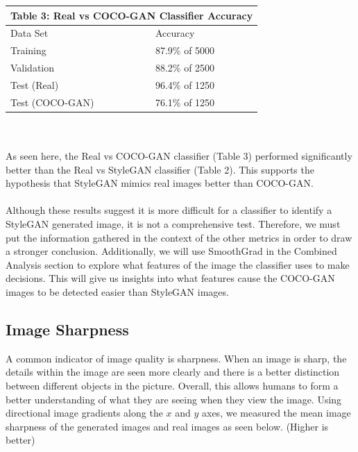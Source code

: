 \documentclass[10pt]{article}
\begin{document}
\begin{multicols*}{2}
        \begin{tabular}{ |p{4cm}|p{3cm}|  }
             \hline
             \multicolumn{2}{|c|}{Table 3: \textbf{Real vs COCO-GAN Classifier Accuracy}} \\
             \hline
            Data Set     & Accuracy\\
             \hline
            Training        & 87.9\% of 5000 \\
             \hline
            Validation      & 88.2\% of 2500 \\
             \hline
            Test (Real)     & 96.4\% of 1250 \\
             \hline
            Test (COCO-GAN) & 76.1\% of 1250 \\
             \hline
        \end{tabular}
        \\\\
        As seen here, the Real vs COCO-GAN classifier (Table 3) performed significantly better than the Real vs StyleGAN classifier (Table 2).
        This supports the hypothesis that StyleGAN mimics real images better than COCO-GAN.
        \\\\
        Although these results suggest it is more difficult for a classifier to identify a StyleGAN generated image, it is not a comprehensive test.
        Therefore, we must put the information gathered in the context of the other metrics in order to draw a stronger conclusion.
        Additionally, we will use SmoothGrad\cite{smoothgrad} in the Combined Analysis section to explore what features of the image the classifier uses to make decisions.
        This will give us insights into what features cause the COCO-GAN images to be detected easier than StyleGAN images.

        \subsection{Image Sharpness}
        \label{subsec:imageSharpness}
        A common indicator of image quality is sharpness.
        When an image is sharp, the details within the image are seen more clearly and there is a better distinction between different objects in the picture.
        Overall, this allows humans to form a better understanding of what they are seeing when they view the image.
        Using directional image gradients along the $x$ and $y$ axes, we measured the mean image sharpness of the generated images and real images as seen below. (Higher is better)\\


\end{multicols*}
\end{document}
